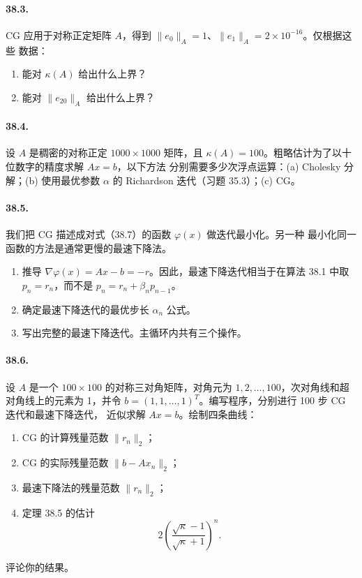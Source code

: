 \documentclass[UTF8,fontset=none,12pt]{ctexart}
\begin{document}
\paragraph{38.3.}
CG 应用于对称正定矩阵 $A$，得到
$\lVert e_0\rVert_A=1$、$\lVert e_1\rVert_A=2\times10^{-16}$。仅根据这些
数据：

\begin{enumerate}[label=(\alph*)]
\item 能对 $\kappa(A)$ 给出什么上界？
\item 能对 $\lVert e_{20}\rVert_A$ 给出什么上界？
\end{enumerate}

\paragraph{38.4.}
设 $A$ 是稠密的对称正定 $1000\times1000$ 矩阵，且
$\kappa(A)=100$。粗略估计为了以十位数字的精度求解 $Ax=b$，以下方法
分别需要多少次浮点运算：(a) Cholesky 分解；(b) 使用最优参数 $\alpha$ 的
Richardson 迭代（习题 35.3）；(c) CG。

\paragraph{38.5.}
我们把 CG 描述成对式（38.7）的函数 $\varphi(x)$ 做迭代最小化。另一种
最小化同一函数的方法是通常更慢的最速下降法。

\begin{enumerate}[label=(\alph*)]
\item 推导 $\nabla\varphi(x)=Ax-b=-r$。因此，最速下降迭代相当于在算法
38.1 中取 $p_n=r_n$，而不是 $p_n=r_n+\beta_np_{n-1}$。
\item 确定最速下降迭代的最优步长 $\alpha_n$ 公式。
\item 写出完整的最速下降迭代。主循环内共有三个操作。
\end{enumerate}

\paragraph{38.6.}
设 $A$ 是一个 $100\times100$ 的对称三对角矩阵，对角元为
$1,2,\ldots,100$，次对角线和超对角线上的元素为 1，并令
$b=(1,1,\ldots,1)^T$。编写程序，分别进行 100 步 CG 迭代和最速下降迭代，
近似求解 $Ax=b$。绘制四条曲线：

\begin{enumerate}[label=(\alph*)]
\item CG 的计算残量范数 $\lVert r_n\rVert_2$；
\item CG 的实际残量范数 $\lVert b-Ax_n\rVert_2$；
\item 最速下降法的残量范数 $\lVert r_n\rVert_2$；
\item 定理 38.5 的估计
\[
2\left(\frac{\sqrt\kappa-1}{\sqrt\kappa+1}\right)^n.
\]
\end{enumerate}

评论你的结果。
\end{document}
